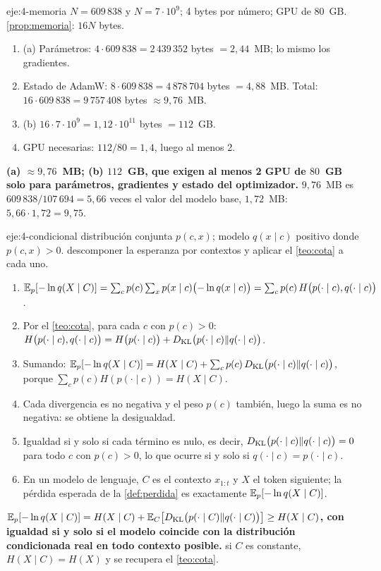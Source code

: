 \begin{solucion}{eje:4-memoria}
\datos $N=609\,838$ y $N=7\cdot 10^{9}$; 4 bytes por número; GPU de 80~GB.
\planteamiento \cref{prop:memoria}: $16N$ bytes.
\pasos
\begin{enumerate}[label=\arabic*.]
  \item (a) Parámetros: $4\cdot 609\,838=2\,439\,352$ bytes $=2{,}44$~MB; lo mismo los gradientes.
  \item Estado de AdamW: $8\cdot 609\,838=4\,878\,704$ bytes $=4{,}88$~MB. Total: $16\cdot 609\,838=9\,757\,408$ bytes $\approx 9{,}76$~MB.
  \item (b) $16\cdot 7\cdot 10^{9}=1{,}12\cdot 10^{11}$ bytes $=112$~GB.
  \item GPU necesarias: $112/80=1{,}4$, luego al menos 2.
\end{enumerate}
\resultado \textbf{(a) $\approx 9{,}76$~MB; (b) $112$~GB, que exigen al menos 2 GPU de $80$~GB solo para parámetros, gradientes y estado del optimizador.}
\comprobacion $9{,}76$~MB es $609\,838/107\,694=5{,}66$ veces el valor del modelo base, $1{,}72$~MB: $5{,}66\cdot 1{,}72=9{,}75$.
\end{solucion}

\begin{solucion}{eje:4-condicional}
\datos distribución conjunta $p(c,x)$; modelo $q(x\mid c)$ positivo donde $p(c,x)>0$.
\planteamiento descomponer la esperanza por contextos y aplicar el \cref{teo:cota} a cada uno.
\pasos
\begin{enumerate}[label=\arabic*.]
  \item $\mathbb{E}_p[-\ln q(X\mid C)]=\sum_{c}p(c)\sum_x p(x\mid c)\bigl(-\ln q(x\mid c)\bigr)=\sum_c p(c)\,H\bigl(p(\cdot\mid c),q(\cdot\mid c)\bigr)$.
  \item Por el \cref{teo:cota}, para cada $c$ con $p(c)>0$: $H\bigl(p(\cdot\mid c),q(\cdot\mid c)\bigr)=H\bigl(p(\cdot\mid c)\bigr)+D_{\mathrm{KL}}\bigl(p(\cdot\mid c)\Vert q(\cdot\mid c)\bigr)$.
  \item Sumando: $\mathbb{E}_p[-\ln q(X\mid C)]=H(X\mid C)+\sum_c p(c)\,D_{\mathrm{KL}}\bigl(p(\cdot\mid c)\Vert q(\cdot\mid c)\bigr)$, porque $\sum_c p(c)H(p(\cdot\mid c))=H(X\mid C)$.
  \item Cada divergencia es no negativa y el peso $p(c)$ también, luego la suma es no negativa: se obtiene la desigualdad.
  \item Igualdad si y solo si cada término es nulo, es decir, $D_{\mathrm{KL}}\bigl(p(\cdot\mid c)\Vert q(\cdot\mid c)\bigr)=0$ para todo $c$ con $p(c)>0$, lo que ocurre si y solo si $q(\cdot\mid c)=p(\cdot\mid c)$.
  \item En un modelo de lenguaje, $C$ es el contexto $x_{1:t}$ y $X$ el token siguiente; la pérdida esperada de la \cref{def:perdida} es exactamente $\mathbb{E}_p[-\ln q(X\mid C)]$.
\end{enumerate}
\resultado \textbf{$\mathbb{E}_p[-\ln q(X\mid C)]=H(X\mid C)+\mathbb{E}_{C}\bigl[D_{\mathrm{KL}}\bigl(p(\cdot\mid C)\Vert q(\cdot\mid C)\bigr)\bigr]\ge H(X\mid C)$, con igualdad si y solo si el modelo coincide con la distribución condicionada real en todo contexto posible.}
\comprobacion si $C$ es constante, $H(X\mid C)=H(X)$ y se recupera el \cref{teo:cota}.
\end{solucion}

